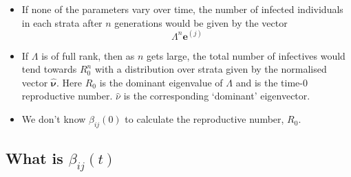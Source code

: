 \documentclass{article}
\renewcommand{\vec}[1]{\boldsymbol{{#1}}}
\begin{document}
\begin{itemize}
\item If none of the parameters vary over time, the number of infected individuals in each strata after $n$ generations would be given by the vector
  \begin{equation*}
    \Lambda^n \vec{e}^{(j)}
  \end{equation*}

\item If $\Lambda$ is of full rank, then as $n$ gets large, the total number of infectives would tend towards $R_0^n$ with a distribution over strata given by the normalised vector $\vec{\hat{\nu}}$. Here $R_0$ is the dominant eigenvalue of $\Lambda$ and is the time-$0$ reproductive number. $\hat{\nu}$ is the corresponding `dominant' eigenvector.

\item We don't know $\beta_{ij}(0)$ to calculate the reproductive number, $R_0$.
\end{itemize}

\subsection*{What is $\beta_{ij}(t)$}
\end{document}
